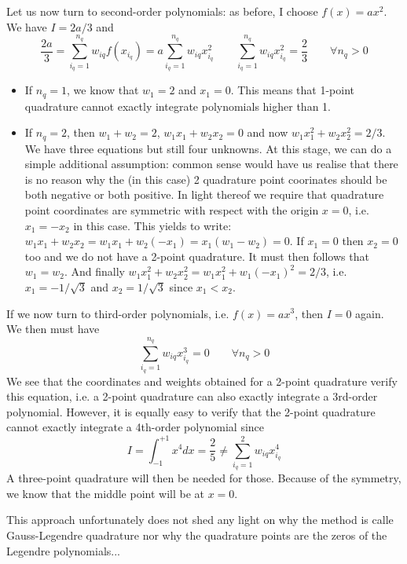 Let us now turn to second-order polynomials: as before, I choose $f(x)=a x^2$. We have 
$I=2a/3$ and 
\begin{equation}
\frac{2a}{3} = \sum_{i_q=1}^{n_q} w_{iq} f(x_{i_q})  = a \sum_{i_q=1}^{n_q} w_{iq} x_{i_q}^2 
\qquad
\boxed{
\sum_{i_q=1}^{n_q} w_{iq} x^2_{i_q} = \frac{2}{3}\qquad \forall n_q>0
}
\label{eq:glqthree}
\end{equation}
\begin{itemize}
\item
If $n_q=1$,  we know that $w_1=2$ and $x_1=0$. This means that 1-point quadrature cannot exactly integrate polynomials 
higher than 1.
\item
If $n_q=2$, then $w_1+w_2=2$, $w_1x_1+w_2x_2 =0$ and now $w_1x_1^2+w_2x_2^2 =2/3$. We have three equations but still four unknowns. At this stage, we can do a simple additional assumption: common sense would have us realise that there is no 
reason why the (in this case) 2 quadrature point coorinates should be both negative or both positive. In light thereof we require that quadrature point coordinates are symmetric with respect with the origin $x=0$, i.e. $x_1=-x_2$ in this case.
This yields to write:  $w_1x_1+w_2x_2 = w_1x_1+w_2(-x_1)=x_1(w_1-w_2)=0$. If $x_1=0$ then $x_2=0$ too and we do not 
have a 2-point quadrature. It must then follows that $w_1=w_2$. And finally 
$w_1x_1^2+w_2x_2^2 = w_1 x_1^2 + w_1 (-x_1)^2=2/3$, i.e. $x_1=-1/\sqrt{3}$ and $x_2=1/\sqrt{3}$ since $x_1<x_2$.
\end{itemize}

If we now turn to third-order polynomials, i.e. $f(x)=ax^3$, then $I=0$ again. We then must have
\begin{equation}
\boxed{
\sum_{i_q=1}^{n_q} w_{iq} x^3_{i_q} =  0  \qquad \forall n_q>0
}
\end{equation}
We see that the coordinates and weights obtained for a 2-point quadrature verify this equation, i.e. 
a 2-point quadrature can also exactly integrate a 3rd-order polynomial.
However, it is equally easy to verify that the 2-point quadrature cannot exactly integrate a 4th-order polynomial
since 
\[
I= \int_{-1}^{+1} x^4 dx = \frac{2}{5} \neq  \sum_{i_q=1}^{2} w_{iq} x_{i_q}^4
\]
A three-point quadrature will then be needed for those. Because of the symmetry, we know that the middle
point will be at $x=0$.

\begin{remark} 
This approach unfortunately does not shed any light on why the method is calle Gauss-Legendre quadrature
nor why the quadrature points are the zeros of the Legendre polynomials...
\end{remark}


